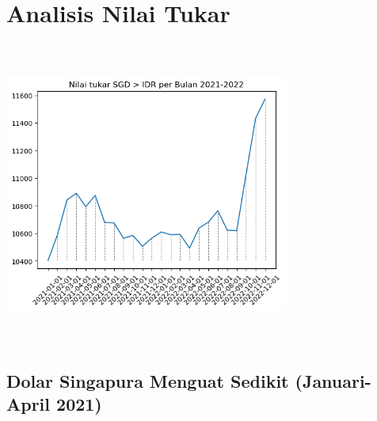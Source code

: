 \documentclass[12pt]{article}
\begin{document}
\section{Analisis Nilai Tukar}
\begin{center}
    \includegraphics[width=0.7\textwidth,height=10cm]{monthly-graph-2}
\end{center}

\subsection*{Dolar Singapura Menguat Sedikit (Januari-April 2021)}
\end{document}
